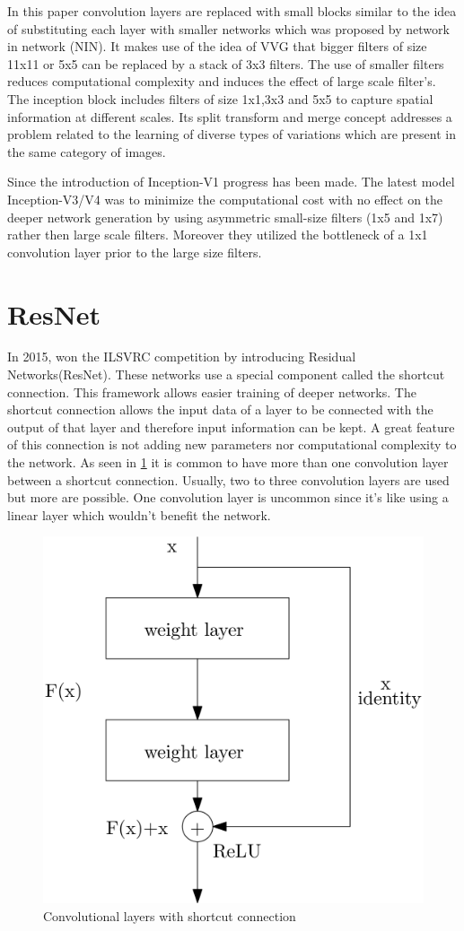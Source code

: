 \documentclass[
a4paper, 
12pt,
grayscalebody, %
abstract=on,
twoside, BCOR10mm, 12pt, DIV13,headinclude, footexclude, final, abstracton, openright
]{ibireprt}
\numberwithin{equation}{chapter}
\numberwithin{table}{chapter}
\numberwithin{figure}{chapter}
\numberwithin{algorithm}{chapter}
\numberwithin{example}{chapter}
\numberwithin{example}{chapter}
\begin{document}
In this paper convolution layers are replaced with small blocks similar to the idea of substituting each layer with smaller networks which was proposed by network in network (NIN). It makes use of the idea of VVG that bigger filters of size 11x11 or 5x5 can be replaced by a stack of 3x3 filters. The use of smaller filters reduces computational complexity and induces the effect of large scale filter's. The inception block includes filters of size 1x1,3x3 and 5x5 to capture spatial information at different scales. Its split transform and merge concept addresses a problem related to the learning of diverse types of variations which are present in the same category of images.

Since the introduction of Inception-V1 progress has been made. The latest model Inception-V3/V4 was to minimize the computational cost with no effect on the deeper network generation by using asymmetric small-size filters (1x5 and 1x7) rather then large scale filters. Moreover they utilized the bottleneck of a 1x1 convolution layer prior to the large size filters. 


\section{ResNet}
In 2015,\cite{He2016a} won the ILSVRC competition by introducing Residual Networks(ResNet). These networks use a special component called the shortcut connection. This framework allows easier training of deeper networks. The shortcut connection allows the input data of a layer to be connected with the output of that layer and therefore input information can be kept. A great feature of this connection is not adding new parameters nor computational complexity to the network. As seen in \ref{fig:ResNet_block} it is common to have more than one convolution layer between a shortcut connection. Usually, two to three convolution layers are used but more are possible. One convolution layer is uncommon since it's like using a linear layer which wouldn't benefit the network.


\begin{figure}[h]	
	\center
	\includegraphics[width = 0.4 \textwidth]{conv_layer_with_skip_connection.png}%
	\caption{Convolutional layers with shortcut connection}
	\label{fig:ResNet_block}
\end{figure}%
\end{document}
